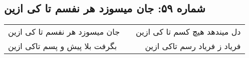 \begin{center}
\section*{شماره ۵۹: جان میسوزد هر نفسم تا کی ازین}
\label{sec:059}
\begin{longtable}{l p{0.5cm} r}
جان میسوزد هر نفسم تا کی ازین
&&
دل میندهد هیچ کسم تا کی ازین
\\
بگرفت بلا پیش و پسم تاکی ازین
&&
فریاد ز فریاد رسم تاکی ازین
\\
\end{longtable}
\end{center}
